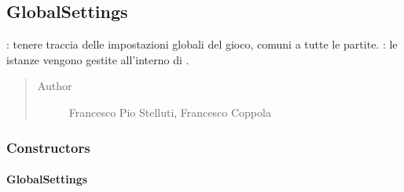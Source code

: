 \documentclass[letterpaper,10pt,italian,openany,oneside]{sphinxmanual}
\begin{document}
\subsection{GlobalSettings}
\label{\detokenize{source/it/unicam/cs/pa/mastermind/gamecore/GlobalSettings:globalsettings}}\label{\detokenize{source/it/unicam/cs/pa/mastermind/gamecore/GlobalSettings::doc}}

\begin{fulllineitems}
\label{\detokenize{source/it/unicam/cs/pa/mastermind/gamecore/GlobalSettings:it.unicam.cs.pa.mastermind.gamecore.GlobalSettings}}
: tenere traccia delle impostazioni globali del gioco, comuni a tutte le partite. : le istanze vengono gestite all’interno di .
\begin{quote}\begin{description}
\item[{Author}] \leavevmode
Francesco Pio Stelluti, Francesco Coppola

\end{description}\end{quote}

\end{fulllineitems}



\subsubsection{Constructors}
\label{\detokenize{source/it/unicam/cs/pa/mastermind/gamecore/GlobalSettings:constructors}}

\paragraph{GlobalSettings}
\label{\detokenize{source/it/unicam/cs/pa/mastermind/gamecore/GlobalSettings:id1}}
\end{document}
